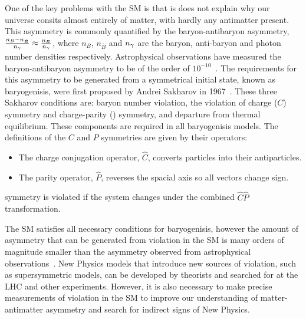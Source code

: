One of the key problems with the SM is that is does not explain why our universe consits almost entirely of matter, with hardly any antimatter present. This asymmetry is commonly quantified by the baryon-antibaryon asymmetry, $\frac{n_{B} - n_{\bar{B}}}{n_{{\gamma}}} \approx \frac{n_{B}}{n_{{\gamma}}}$, where $n_{B}$, $n_{\bar{B}}$ and $n_{{\gamma}}$ are the baryon, anti-baryon and photon number densities respectively. Astrophysical observations have measured the baryon-antibaryon asymmetry to be of the order of $10^{-10}$~\cite{astrophysicalasy}. The requirements for this asymmetry to be generated from a symmetrical initial state, known as baryogenisis, were first proposed by Andrei Sakharov in 1967~\cite{sakharov}. These three Sakharov conditions are: baryon number violation, the violation of charge ($C$) symmetry and charge-parity (\CP) symmetry, and departure from thermal equilibrium. These components are required in all baryogenisis models. The definitions of the $C$ and $P$ symmetries are given by their operators:
\begin{itemize}
\item The charge conjugation operator, $\hat{C}$, converts particles into their antiparticles.
\item The parity operator, $\hat{P}$, reverses the spacial axis so all vectors change sign.
\end{itemize}
\CP symmetry is violated if the system changes under the combined $\hat{C}\hat{P}$ transformation.

The SM satisfies all necessary conditions for baryogenisis, however the amount of asymmetry that can be generated from \CP violation in the SM is many orders of magnitude smaller than the asymmetry observed from astrophysical observations~\cite{SMasy}. New Physics models that introduce new sources of \CP violation{\color{red}{[ref]}}, such as supersymmetric models, can be developed by theorists and searched for at the LHC and other experiments. However, it is also necessary to make precise measurements of \CP violation in the SM to improve our understanding of matter-antimatter asymmetry and search for indirect signs of New Physics.

